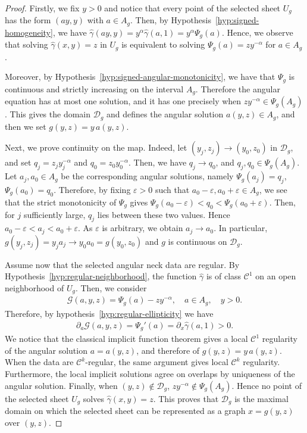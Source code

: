 \documentclass{amsart}
\theoremstyle{plain}
\theoremstyle{mainintrothm}
\theoremstyle{definition}
\begin{document}
	\begin{proof}
	Firstly, we	fix $y>0$ and notice that  every point of the selected sheet $U_g$ has the form $(ay,y)$ with $a\in A_g$. Then,  by Hypothesis~\ref{hyp:signed-homogeneity}, we have $\widehat\gamma(ay,y)=y^\alpha\widehat\gamma(a,1)
		=y^\alpha\Psi_g(a)$.  Hence, we observe that solving
		$\widehat\gamma(x,y)=z$ in $U_g$ is equivalent to solving $\Psi_g(a)=zy^{-\alpha}$ for $a\in A_g$.
		
		\medskip

		Moreover, by Hypothesis~\ref{hyp:signed-angular-monotonicity}, we have that 
		$\Psi_g$ is continuous and strictly increasing on the interval $A_g$.
		Therefore the angular equation has at most one solution, and it has one
		precisely when $zy^{-\alpha}\in\Psi_g(A_g)$.  This gives the domain
		$\mathcal D_g$ and defines the angular solution $a(y,z)\in A_g$, and then we set $g(y,z)=y\,a(y,z)$.
		
		\medskip

		Next, we prove continuity on the map. Indeed,  let $(y_j,z_j)\to(y_0,z_0)$ in $\mathcal D_g$,
		and set $q_j=z_jy_j^{-\alpha}$ and $q_0=z_0y_0^{-\alpha}$.
		Then, we have $q_j\to q_0$, and $q_j,q_0\in\Psi_g(A_g)$. Let $a_j,a_0\in A_g$ be the corresponding angular solutions, namely $\Psi_g(a_j)=q_j$, $\Psi_g(a_0)=q_0$. Therefore,  by fixing $\varepsilon>0$ such that
		$a_0-\varepsilon,a_0+\varepsilon\in A_g$,  we see that the strict monotonicity of $\Psi_g$ gives $\Psi_g(a_0-\varepsilon)	<q_0<\Psi_g(a_0+\varepsilon)$. Then, for $j$ sufficiently large, $q_j$ lies between these two values. Hence
		$a_0-\varepsilon<a_j<a_0+\varepsilon$.  As $\varepsilon$ is arbitrary, we
		obtain $a_j\to a_0$.  In particular, $g(y_j,z_j)=y_j a_j\to y_0 a_0=g(y_0,z_0)$ and $g$ is continuous on $\mathcal D_g$.
		
		\medskip

		Assume now that the selected angular neck data are regular.  By
		Hypothesis~\ref{hyp:regular-neighborhood}, the function $\widehat\gamma$ is
		of class $\mathcal C^1$ on an open neighborhood of $U_g$. Then, we consider
		\begin{align*}
			\mathcal G(a,y,z)
			=
			\Psi_g(a)-zy^{-\alpha},
			\quad
			a\in A_g,
			\quad
			y>0.
		\end{align*}
		Therefore, by hypothesis~\ref{hyp:regular-ellipticity}  we have 
		\begin{align*}
			\partial_a\mathcal G(a,y,z)
			=
			\Psi_g'(a)
			=
			\partial_x\widehat\gamma(a,1)
			>
			0.
		\end{align*}
		We notice that the classical implicit function theorem gives a local $\mathcal C^1$ regularity of the angular solution $a=a(y,z)$, and therefore of
		$g(y,z)=y\,a(y,z)$.  When the data are $\mathcal C^k$-regular, the same
		argument gives local $\mathcal C^k$ regularity. Furthermore, the local implicit solutions agree on overlaps by uniqueness of the angular
		solution.  Finally, when $(y,z)\notin\mathcal D_g$, $zy^{-\alpha}\notin\Psi_g(A_g)$.  Hence no point of the selected sheet
		$U_g$ solves $\widehat\gamma(x,y)=z$.  This proves that $\mathcal D_g$ is
		the maximal domain on which the selected sheet can be represented as a graph
		$x=g(y,z)$ over $(y,z)$.
	\end{proof}
\end{document}
